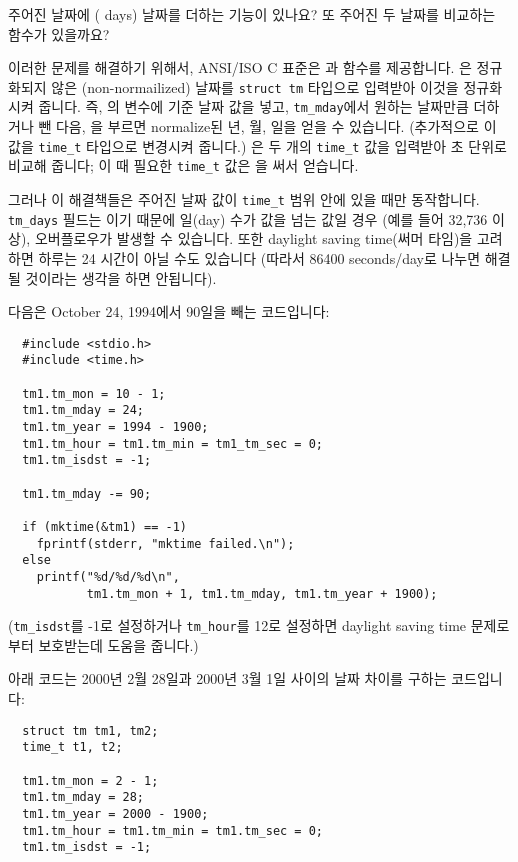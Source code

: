 \begin{faq}
	주어진 날짜에 ( days) 날짜를 더하는 기능이 있나요?
	또 주어진 두 날짜를 비교하는 함수가 있을까요?

\A
	이러한 문제를 해결하기 위해서, ANSI/ISO C 표준은
	과  함수를 제공합니다.
	은 정규화되지 않은 (non-normailized) 날짜를
	\verb+struct tm+ 타입으로 입력받아 이것을 정규화시켜 줍니다.
	즉, 의 변수에 기준 날짜 값을 넣고, 
        \verb+tm_mday+에서 원하는 날짜만큼 더하거나 뺀 다음, 을
        부르면 normalize된 년, 월, 일을 얻을 수 있습니다.
        (추가적으로 이 값을 \verb+time_t+ 타입으로 변경시켜 줍니다.)
	은 두 개의 \verb+time_t+ 값을 입력받아 초 단위로
	비교해 줍니다; 이 때 필요한 \verb+time_t+ 값은 을 써서
        얻습니다.

	그러나 이 해결책들은 주어진 날짜 값이 \verb+time_t+ 범위 안에
        있을 때만 동작합니다.
	\verb+tm_days+ 필드는 이기 때문에 일(day) 수가
	 값을 넘는 값일 경우 (예를 들어 32,736 이상), 오버플로우가
        발생할 수 있습니다.
	또한 daylight saving time(써머 타임)을 고려하면
	하루는 24 시간이 아닐 수도 있습니다 (따라서 86400 seconds/day로 나누면
	해결될 것이라는 생각을 하면 안됩니다).

        다음은 October 24, 1994에서 90일을 빼는 코드입니다:
\begin{verbatim}
  #include <stdio.h>
  #include <time.h>

  tm1.tm_mon = 10 - 1;
  tm1.tm_mday = 24;
  tm1.tm_year = 1994 - 1900;
  tm1.tm_hour = tm1.tm_min = tm1_tm_sec = 0;
  tm1.tm_isdst = -1;

  tm1.tm_mday -= 90;

  if (mktime(&tm1) == -1)
    fprintf(stderr, "mktime failed.\n");
  else
    printf("%d/%d/%d\n",
           tm1.tm_mon + 1, tm1.tm_mday, tm1.tm_year + 1900);
\end{verbatim}
	\noindent (\verb+tm_isdst+를 -1로 설정하거나 \verb+tm_hour+를
        12로 설정하면 daylight saving time 문제로부터 보호받는데
        도움을 줍니다.)

        아래 코드는 2000년 2월 28일과 2000년 3월 1일 사이의 날짜 차이를 구하는
        코드입니다:
\begin{verbatim}
  struct tm tm1, tm2;
  time_t t1, t2;

  tm1.tm_mon = 2 - 1;
  tm1.tm_mday = 28;
  tm1.tm_year = 2000 - 1900;
  tm1.tm_hour = tm1.tm_min = tm1.tm_sec = 0;
  tm1.tm_isdst = -1;


\end{verbatim}
\end{faq}
